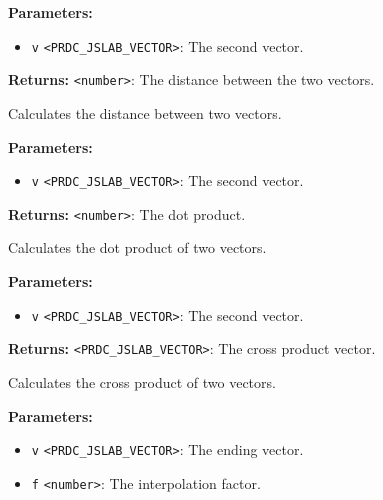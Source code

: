 \documentclass[12pt,a4paper]{article}
\begin{document}
\noindent \textbf{Parameters:}
\begin{itemize}
  \item \texttt{v} \texttt{<PRDC\_JSLAB\_VECTOR>}: The second vector.
\end{itemize}

\noindent \textbf{Returns:} \texttt{<number>}: The distance between the two vectors.

\noindent Calculates the distance between two vectors.

\vspace{5mm}
\noindent {}


\noindent \textbf{Parameters:}
\begin{itemize}
  \item \texttt{v} \texttt{<PRDC\_JSLAB\_VECTOR>}: The second vector.
\end{itemize}

\noindent \textbf{Returns:} \texttt{<number>}: The dot product.

\noindent Calculates the dot product of two vectors.

\vspace{5mm}
\noindent {}


\noindent \textbf{Parameters:}
\begin{itemize}
  \item \texttt{v} \texttt{<PRDC\_JSLAB\_VECTOR>}: The second vector.
\end{itemize}

\noindent \textbf{Returns:} \texttt{<PRDC\_JSLAB\_VECTOR>}: The cross product vector.

\noindent Calculates the cross product of two vectors.

\vspace{5mm}
\noindent {}


\noindent \textbf{Parameters:}
\begin{itemize}
  \item \texttt{v} \texttt{<PRDC\_JSLAB\_VECTOR>}: The ending vector.
  \item \texttt{f} \texttt{<number>}: The interpolation factor.
\end{itemize}
\end{document}

